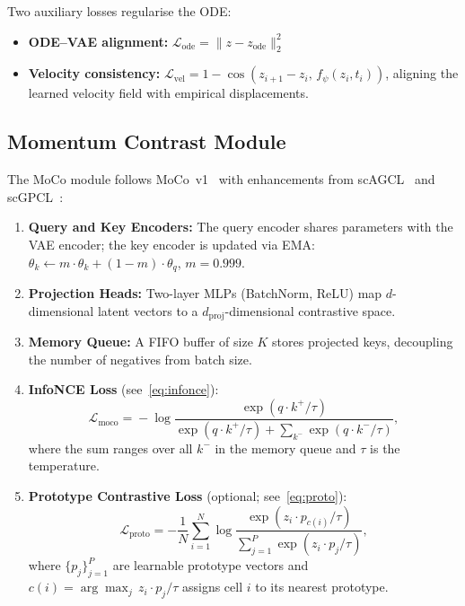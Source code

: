 \documentclass[preprint,12pt,number]{elsarticle}
\begin{document}
Two auxiliary losses regularise the ODE:
\begin{itemize}
    \item \textbf{ODE--VAE alignment:} $\mathcal{L}_{\mathrm{ode}} = \| z - z_{\mathrm{ode}} \|_2^2$
    \item \textbf{Velocity consistency:} $\mathcal{L}_{\mathrm{vel}} = 1 - \cos(z_{i+1} - z_i,\, f_\psi(z_i, t_i))$, aligning the learned velocity field with empirical displacements.
\end{itemize}

\subsection{Momentum Contrast Module}
\label{sec:method:moco}

The MoCo module follows MoCo~v1~\cite{he2020momentum} with enhancements from scAGCL~\cite{cai2024scagcl} and scGPCL~\cite{cai2024scgpcl}:

\begin{enumerate}
    \item \textbf{Query and Key Encoders:} The query encoder shares parameters with the VAE encoder; the key encoder is updated via EMA: $\theta_k \leftarrow m \cdot \theta_k + (1 - m) \cdot \theta_q$, $m = 0.999$.
    \item \textbf{Projection Heads:} Two-layer MLPs (BatchNorm, ReLU) map $d$-dimensional latent vectors to a $d_{\mathrm{proj}}$-dimensional contrastive space.
    \item \textbf{Memory Queue:} A FIFO buffer of size $K$ stores projected keys, decoupling the number of negatives from batch size.
    \item \textbf{InfoNCE Loss} (see~\eqref{eq:infonce}):
    \begin{equation}
        \mathcal{L}_{\mathrm{moco}} \!=\! -\log \frac{\exp(q \!\cdot\! k^+ / \tau)}{\exp(q \!\cdot\! k^+ / \tau) + \!\sum_{k^-} \exp(q \!\cdot\! k^- / \tau)},
        \label{eq:infonce}
    \end{equation}
    where the sum ranges over all $k^-$ in the memory queue and $\tau$ is the temperature.
    \item \textbf{Prototype Contrastive Loss} (optional; see~\eqref{eq:proto}):
    \begin{equation}
        \mathcal{L}_{\mathrm{proto}} = -\frac{1}{N} \sum_{i=1}^{N} \log \frac{\exp(z_i \cdot p_{c(i)} / \tau)}{\sum_{j=1}^{P} \exp(z_i \cdot p_j / \tau)},
        \label{eq:proto}
    \end{equation}
    where $\{p_j\}_{j=1}^{P}$ are learnable prototype vectors and $c(i) = \arg\max_j\, z_i \cdot p_j / \tau$ assigns cell $i$ to its nearest prototype.
\end{enumerate}
\end{document}
